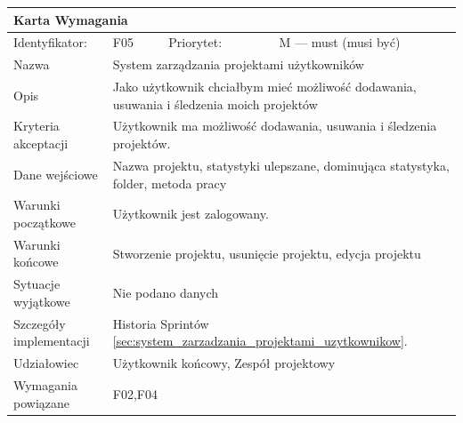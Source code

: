 \documentclass[a4paper,11pt]{report}
\begin{document}
		\begin{tabular}{|p{3cm}|p{2cm}|p{2cm}|p{6cm}|}
		\hline
		\multicolumn{4}{|p{12 cm}|}{Karta Wymagania}\\
		\hline
		Identyfikator: & F05 & Priorytet: & M — must (musi być)\\
		\hline
		Nazwa & \multicolumn{3}{|p{10 cm}|}{System zarządzania projektami użytkowników}\\
		\hline
		Opis & \multicolumn{3}{|p{10 cm}|}{Jako użytkownik chciałbym mieć możliwość dodawania, usuwania i śledzenia moich projektów}\\
		\hline
		Kryteria akceptacji & \multicolumn{3}{|p{10 cm}|}{Użytkownik ma możliwość dodawania, usuwania i śledzenia projektów.}\\
		\hline
		Dane wejściowe & \multicolumn{3}{|p{10 cm}|}{Nazwa projektu, statystyki ulepszane, dominująca statystyka, folder, metoda pracy}\\
		\hline
		Warunki początkowe & \multicolumn{3}{|p{10 cm}|}{Użytkownik jest zalogowany.}\\
		\hline
		Warunki końcowe & \multicolumn{3}{|p{10 cm}|}{Stworzenie projektu, usunięcie projektu, edycja projektu}\\
		\hline
		Sytuacje wyjątkowe & \multicolumn{3}{|p{10 cm}|}{Nie podano danych}\\
		\hline
		Szczegóły implementacji & \multicolumn{3}{|p{10 cm}|}{Historia Sprintów \ref{sec:system_zarzadzania_projektami_uzytkownikow}.}\\
		\hline
		Udziałowiec & \multicolumn{3}{|p{10 cm}|}{Użytkownik końcowy, Zespół projektowy}\\
		\hline
		Wymagania powiązane & \multicolumn{3}{|p{10 cm}|}{F02,F04}\\
		\hline
		\end{tabular}\\
		\newline
		\vspace*{0,2 cm}
		\newline
\end{document}
